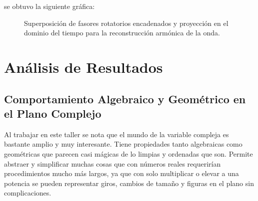 \documentclass[11pt,a4paper]{article}
\begin{document}
\noindent se obtuvo la siguiente gráfica:

\begin{figure}[htbp]
    \centering
    \caption{Superposición de fasores rotatorios encadenados y proyección en el dominio del tiempo para la reconstrucción armónica de la onda.}
    \label{fig:problema5_fasores}
\end{figure}


\section{Análisis de Resultados}

\subsection{Comportamiento Algebraico y Geométrico en el Plano Complejo}
Al trabajar en este taller se nota que el mundo de la variable compleja es bastante amplio y muy interesante. Tiene propiedades tanto algebraicas como geométricas que parecen casi mágicas de lo limpias y ordenadas que son. Permite abstraer y simplificar muchas cosas que con números reales requerirían procedimientos mucho más largos, ya que con solo multiplicar o elevar a una potencia se pueden representar giros, cambios de tamaño y figuras en el plano sin complicaciones.
\end{document}
